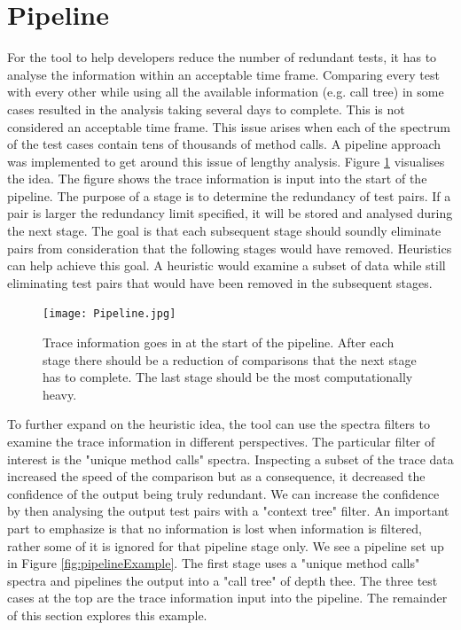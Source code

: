 \section{Pipeline }
\label{pipelinesection}
For the tool to help developers reduce the number of redundant tests, it has to analyse the information within an acceptable time frame. Comparing every test with every other while using all the available information (e.g. call tree) in some cases resulted in the analysis taking several days to complete. This is not considered an acceptable time frame. This issue arises when each of the spectrum of the test cases contain tens of thousands of method calls. A pipeline approach was implemented to get around this issue of lengthy analysis. Figure \ref{fig:pipeline} visualises the idea. The figure shows the trace information is input into the start of the pipeline. The purpose of a stage is to determine the redundancy of test pairs. If a pair is larger the redundancy limit specified, it will be stored and analysed during the next stage. The goal is that each subsequent stage should soundly eliminate pairs from consideration that the following stages would have removed. Heuristics can help achieve this goal. A heuristic would examine a subset of data while still eliminating test pairs that would have been removed in the subsequent stages. 

\begin{figure}[h]
\texttt{[image: Pipeline.jpg]}
\caption{Trace information goes in at the start of the pipeline. After each stage there should be a reduction of comparisons that the next stage has to complete. The last stage should be the most computationally heavy.}
\label{fig:pipeline}
\end{figure}

To further expand on the heuristic idea, the tool can use the spectra filters to examine the trace information in different perspectives. The particular filter of interest is the "unique method calls" spectra. Inspecting a subset of the trace data increased the speed of the comparison but as a consequence, it decreased the confidence of the output being truly redundant. We can increase the confidence by then analysing the output test pairs with a "context tree" filter. An important part to emphasize is that no information is lost when information is filtered, rather some of it is ignored for that pipeline stage only. We see a pipeline set up in Figure \ref{fig:pipelineExample}. The first stage uses a "unique method calls" spectra and pipelines the output into a "call tree" of depth thee. The three test cases at the top are the trace information input into the pipeline. The remainder of this section explores this example. 

